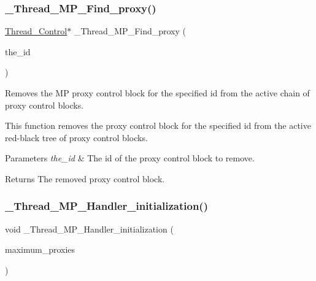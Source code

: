 \subsubsection{\texorpdfstring{\_Thread\_MP\_Find\_proxy()}{\_Thread\_MP\_Find\_proxy()}}
{\footnotesize\ttfamily \mbox{\hyperlink{struct__Thread__Control}{Thread\+\_\+\+Control}}$\ast$ \+\_\+\+Thread\+\_\+\+M\+P\+\_\+\+Find\+\_\+proxy (\begin{DoxyParamCaption}\item[{\mbox{\hyperlink{group__RTEMSScoreObject_ga5821f52a51072941bdd603e542d0863e}{Objects\+\_\+\+Id}}}]{the\+\_\+id }\end{DoxyParamCaption})}



Removes the MP proxy control block for the specified id from the active chain of proxy control blocks. 

This function removes the proxy control block for the specified id from the active red-\/black tree of proxy control blocks.


\begin{DoxyParams}{Parameters}
{\em the\+\_\+id} & The id of the proxy control block to remove.\\
\hline
\end{DoxyParams}
\begin{DoxyReturn}{Returns}
The removed proxy control block. 
\end{DoxyReturn}
\mbox{\label{group__RTEMSScoreThreadMP_ga96f0434ad7036721909abeedd0322bba}} 
\subsubsection{\texorpdfstring{\_Thread\_MP\_Handler\_initialization()}{\_Thread\_MP\_Handler\_initialization()}}
{\footnotesize\ttfamily void \+\_\+\+Thread\+\_\+\+M\+P\+\_\+\+Handler\+\_\+initialization (\begin{DoxyParamCaption}\item[{uint32\+\_\+t}]{maximum\+\_\+proxies }\end{DoxyParamCaption})}



